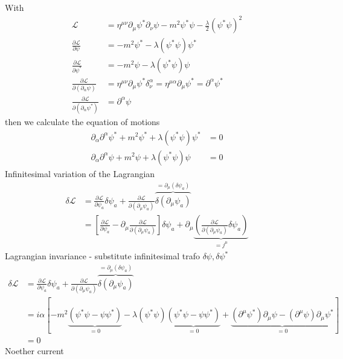 \documentclass[../main.tex]{subfiles}
\begin{document}
With
\begin{align}
\mathcal{L}
&=\eta^{\mu\nu}\partial_\mu\psi^*\partial_\nu\psi-m^2\psi^*\psi-\frac{\lambda}{2}(\psi^*\psi)^2\\
\frac{\partial \mathcal{L}}{\partial\psi}
&=-m^2\psi^*-\lambda(\psi^*\psi)\psi^*\\
\frac{\partial \mathcal{L}}{\partial\psi^*}
&=-m^2\psi-\lambda(\psi^*\psi)\psi\\
\frac{\partial \mathcal{L}}{\partial(\partial_\alpha\psi)}
&=\eta^{\mu\nu}\partial_\mu\psi^*\delta^\alpha_\nu
=\eta^{\mu\alpha}\partial_\mu\psi^*
=\partial^\alpha\psi^*\\
\frac{\partial \mathcal{L}}{\partial(\partial_\alpha\psi^*)}
&=\partial^\alpha\psi
\end{align}
then we calculate the equation of motions
\begin{align}
\partial_\alpha\partial^\alpha\psi^*+m^2\psi^*+\lambda(\psi^*\psi)\psi^*&=0\\
\partial_\alpha\partial^\alpha\psi+m^2\psi+\lambda(\psi^*\psi)\psi&=0
\end{align}
Infinitesimal variation of the Lagrangian
\begin{align}
\delta\mathcal{L}
&=\frac{\partial\mathcal{L}}{\partial\psi_a}\delta\psi_a+\frac{\partial\mathcal{L}}{\partial(\partial_\mu\psi_a)}\overbrace{\delta(\partial_\mu\psi_a)}^{=\partial_\mu(\delta\psi_a)}\\
&=\left[\frac{\partial\mathcal{L}}{\partial\psi_a}-\partial_\mu\frac{\partial\mathcal{L}}{\partial(\partial_\mu\psi_a)}\right]\delta\psi_a+\partial_\mu\underbrace{\left(\frac{\partial\mathcal{L}}{\partial(\partial_\mu\psi_a)}\delta\psi_a\right)}_{=j^\mu}
\end{align}
Lagrangian invariance - substitute infinitesimal trafo $\delta\psi, \delta\psi^*$
\begin{align}
\delta\mathcal{L}
&=\frac{\partial\mathcal{L}}{\partial\psi_a}\delta\psi_a+\frac{\partial\mathcal{L}}{\partial(\partial_\mu\psi_a)}\overbrace{\delta(\partial_\mu\psi_a)}^{=\partial_\mu(\delta\psi_a)}\\
&=i\alpha\left[-m^2\underbrace{(\psi^*\psi-\psi\psi^*)}_{=0}-\lambda(\psi^*\psi)\underbrace{(\psi^*\psi-\psi\psi^*)}_{=0}+\underbrace{(\partial^\mu\psi^*)\partial_\mu\psi-(\partial^\mu\psi)\partial_\mu\psi^*}_{=0}\right]\\
&=0
\end{align}
Noether current 
\end{document}
